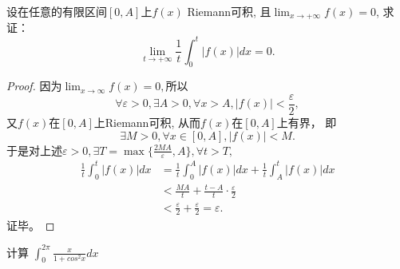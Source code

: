   \begin{example}
  设在任意的有限区间$[0,A]$上$f(x)$ Riemann可积,
  且$\lim_{x\rightarrow+\infty}f(x)=0$,
  求证：
  \begin{equation} 
  \lim_{t\rightarrow+\infty}\frac 1t\int_0^t|f(x)|dx=0.
  \end{equation} 
\end{example}

\begin{proof} 
  因为$\lim_{x\rightarrow\infty}f(x)=0,$所以$$\forall\varepsilon>0,\exists A>0,\forall x>A,|f(x)|<\frac{\varepsilon}{2},$$
  又$f(x)$在$[0,A]$上Riemann可积, 从而$f(x)$在$[0,A]$上有界，
  即$$\exists M>0,\forall x\in[0,A],|f(x)|<M.$$
  于是对上述$\varepsilon>0,\exists T=\max\{\frac{2MA}{\varepsilon},A\},\forall t>T,$
  \begin{align*}
  \frac{1}{t}\int_0^t|f(x)|dx&=\frac1t\int_0^A|f(x)|dx+\frac1t\int_A^t|f(x)|dx\\
  &<\frac{MA}{t}+\frac{t-A}{t}\cdot\frac{\varepsilon}{2}\\
  &<\frac{\varepsilon}{2}+\frac{\varepsilon}{2}=\varepsilon.
  \end{align*}
  证毕。
\end{proof}

  
  \begin{example}
  计算 $\int_0^{2\pi}\frac x{1+cos^2x}dx$ %
  \end{example}

